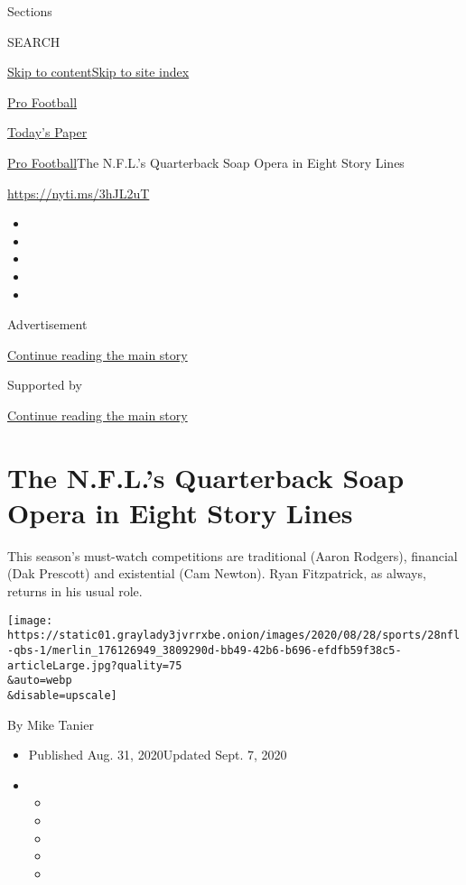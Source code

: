 Sections

SEARCH

\protect\hyperlink{site-content}{Skip to
content}\protect\hyperlink{site-index}{Skip to site index}

\href{https://www.nytimes3xbfgragh.onion/section/sports/football}{Pro
Football}

\href{https://myaccount.nytimes3xbfgragh.onion/auth/login?response_type=cookie\&client_id=vi}{}

\href{https://www.nytimes3xbfgragh.onion/section/todayspaper}{Today's
Paper}

\href{/section/sports/football}{Pro Football}\textbar{}The N.F.L.'s
Quarterback Soap Opera in Eight Story Lines

\url{https://nyti.ms/3hJL2uT}

\begin{itemize}
\item
\item
\item
\item
\item
\end{itemize}

Advertisement

\protect\hyperlink{after-top}{Continue reading the main story}

Supported by

\protect\hyperlink{after-sponsor}{Continue reading the main story}

\hypertarget{the-nfls-quarterback-soap-opera-in-eight-story-lines}{%
\section{The N.F.L.'s Quarterback Soap Opera in Eight Story
Lines}\label{the-nfls-quarterback-soap-opera-in-eight-story-lines}}

This season's must-watch competitions are traditional (Aaron Rodgers),
financial (Dak Prescott) and existential (Cam Newton). Ryan Fitzpatrick,
as always, returns in his usual role.

\texttt{[image: https://static01.graylady3jvrrxbe.onion/images/2020/08/28/sports/28nfl-qbs-1/merlin\_176126949\_3809290d-bb49-42b6-b696-efdfb59f38c5-articleLarge.jpg?quality=75\\\&auto=webp\\\&disable=upscale]}

By Mike Tanier

\begin{itemize}
\item
  Published Aug. 31, 2020Updated Sept. 7, 2020
\item
  \begin{itemize}
  \item
  \item
  \item
  \item
  \item
  \end{itemize}
\end{itemize}

